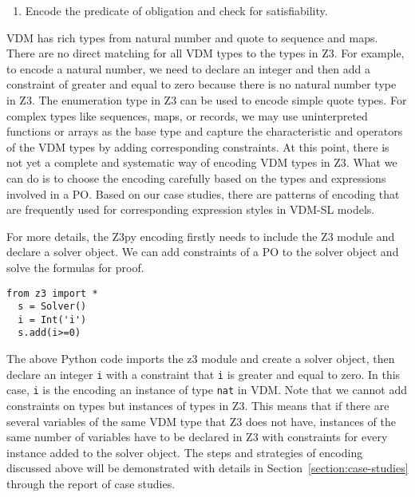 \begin{enumerate}
\begin{enumerate}
\end{enumerate}
\item
Encode the predicate of obligation and check for satisfiability.
\end{enumerate}

VDM has rich types from natural number and quote to sequence and maps. There are no direct matching for all VDM types to the types in Z3. For example, to encode a natural number, we need to declare an integer and then add a constraint of greater and equal to zero because there is no natural number type in Z3. The enumeration type in Z3 can be used to encode simple quote types. For complex types like sequences, maps, or records, we may use uninterpreted functions or arrays as the base type and capture the characteristic and operators of the VDM types by adding corresponding constraints. At this point, there is not yet a complete and systematic way of encoding VDM types in Z3. What we can do is to choose the encoding carefully based on the types and expressions involved in a PO. Based on our case studies, there are patterns of encoding that are frequently used for corresponding expression styles in VDM-SL models.

For more details, the Z3py encoding firstly needs to include the Z3 module and declare a solver object. We can add constraints of a PO to the solver object and solve the formulas for proof.

\begin{mdframed}[roundcorner=5pt,shadow=true]
\begin{Verbatim}[fontsize=\small]
  from z3 import *
  s = Solver()
  i = Int('i')
  s.add(i>=0)
\end{Verbatim}
\end{mdframed}

The above Python code imports the z3 module and create a solver object, then declare an integer {\tt i} with a constraint that {\tt i} is greater and equal to zero. In this case, {\tt i} is the encoding an instance of type {\tt nat} in VDM. Note that we cannot add constraints on types but instances of types in Z3. This means that if there are several variables of the same VDM type that Z3 does not have, instances of the same number of variables have to be declared in Z3 with constraints for every instance added to the solver object. The steps and strategies of encoding discussed above will be demonstrated with details in Section~\ref{section:case-studies} through the report of case studies.


